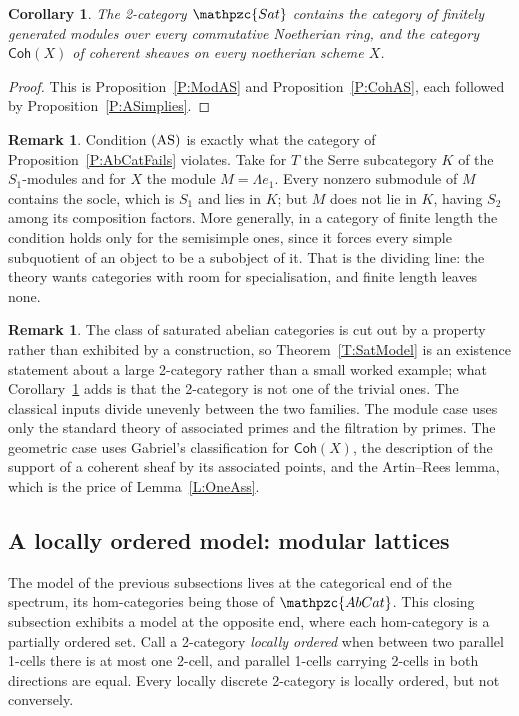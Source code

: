 \documentclass[reqno,a4paper]{amsart}
\numberwithin{equation}{section}
\theoremstyle{plain}
\newtheorem{corollary}[subsection]{Corollary}
\theoremstyle{definition}
\newtheorem{remark}[subsection]{Remark}
\def\nameit#1{\textrm{#1}~}
\def\thex{\nameit{Theorem}}
\def\prox{\nameit{Proposition}}
\def\corx{\nameit{Corollary}}
\def\lemx{\nameit{Lemma}}
\def\dfn#1{{\itshape #1}}
\newcommand{\catfont}[1]{\ensuremath{\mathpzc{#1}}\xspace}
\newcommand{\onecat}[1]{\ensuremath{\mathsf{#1}}\xspace}
\newcommand{\AbCat}{\catfont{AbCat}}
\newcommand{\Sat}{\catfont{Sat}}
\renewcommand{\1}{\onecat{1}}
\newcommand{\Coh}{\onecat{Coh}}
\newcommand{\AS}{\textup{(AS)}}
\begin{document}
\begin{corollary}\label{C:Populated}
	The 2-category \(\Sat\) contains the category of finitely generated modules over every commutative Noetherian ring, and the category \(\Coh(X)\) of coherent sheaves on every noetherian scheme \(X\).
\end{corollary}

\begin{proof}
	This is \prox\ref{P:ModAS} and \prox\ref{P:CohAS}, each followed by \prox\ref{P:ASimplies}.
\end{proof}

\begin{remark}\label{Rem WhereNot}
	Condition \(\AS\) is exactly what the category of \prox\ref{P:AbCatFails} violates. Take for \(T\) the Serre subcategory \(K\) of the \(S_{1}\)-modules and for \(X\) the module \(M=\Lambda e_{1}\). Every nonzero submodule of \(M\) contains the socle, which is \(S_{1}\) and lies in \(K\); but \(M\) does not lie in \(K\), having \(S_{2}\) among its composition factors. More generally, in a category of finite length the condition holds only for the semisimple ones, since it forces every simple subquotient of an object to be a subobject of it. That is the dividing line: the theory wants categories with room for specialisation, and finite length leaves none.
\end{remark}

\begin{remark}\label{Rem Model Shape}
	The class of saturated abelian categories is cut out by a property rather than exhibited by a construction, so \thex\ref{T:SatModel} is an existence statement about a large 2-category rather than a small worked example; what \corx\ref{C:Populated} adds is that the 2-category is not one of the trivial ones. The classical inputs divide unevenly between the two families. The module case uses only the standard theory of associated primes and the filtration by primes. The geometric case uses Gabriel's classification for \(\Coh(X)\), the description of the support of a coherent sheaf by its associated points, and the Artin--Rees lemma, which is the price of \lemx\ref{L:OneAss}.
\end{remark}


\subsection{A locally ordered model: modular lattices}\label{SS:ModelLattices}

The model of the previous subsections lives at the categorical end of the spectrum, its hom-categories being those of \(\AbCat\). This closing subsection exhibits a model at the opposite end, where each hom-category is a partially ordered set. Call a 2-category \dfn{locally ordered} when between two parallel 1-cells there is at most one 2-cell, and parallel 1-cells carrying 2-cells in both directions are equal. Every locally discrete 2-category is locally ordered, but not conversely.
\end{document}
